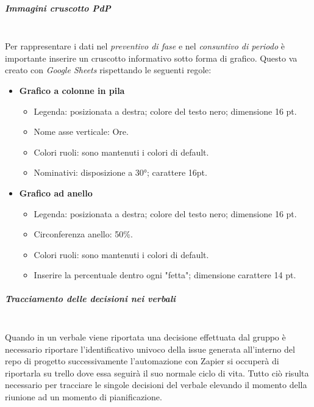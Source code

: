 \subparagraph{Immagini cruscotto PdP}
\mbox{}\\
Per rappresentare i dati nel \textit{preventivo di fase} e nel \textit{consuntivo di periodo}
è importante inserire un cruscotto informativo sotto forma di grafico. Questo va creato con
\textit{Google Sheets} rispettando le seguenti regole:
\begin{itemize}
    \item \textbf{Grafico a colonne in pila}
    \begin{itemize}
        \item Legenda: posizionata a destra; colore del testo nero; dimensione 16 pt.
        \item Nome asse verticale: Ore.
        \item Colori ruoli: sono mantenuti i colori di default.
        \item Nominativi: disposizione a 30°; carattere 16pt.
    \end{itemize}
    \item \textbf{Grafico ad anello}
    \begin{itemize}
        \item Legenda: posizionata a destra; colore del testo nero; dimensione 16 pt.
        \item Circonferenza anello: 50\%.
        \item Colori ruoli: sono mantenuti i colori di default.
        \item Inserire la percentuale dentro ogni "fetta"; dimensione carattere 14 pt.
    \end{itemize}
\end{itemize}

\subparagraph{Tracciamento delle decisioni nei verbali}
\mbox{}\\
Quando in un verbale viene riportata una decisione effettuata dal gruppo è necessario
riportare l'identificativo univoco della issue generata all'interno del repo di progetto
successivamente l'automazione con Zapier si occuperà di riportarla su trello dove essa
seguirà il suo normale ciclo di vita.
Tutto ciò risulta necessario per tracciare le singole decisioni del verbale elevando il
momento della riunione ad un momento di pianificazione.

